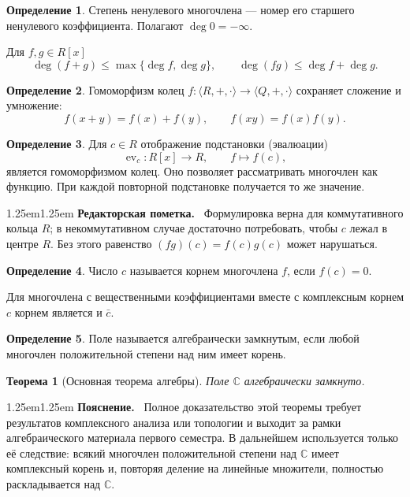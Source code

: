 \documentclass[12pt,a4paper,oneside,openany]{book}
\theoremstyle{definition}
\newtheorem{definition}{Определение}[chapter]
\theoremstyle{plain}
\newtheorem{theorem}{Теорема}[chapter]
\theoremstyle{remark}
\newenvironment{explanation}
  {\begin{adjustwidth}{1.25em}{1.25em}\small
   \noindent\textcolor{logicteal}{\sffamily\bfseries Пояснение.}\ }
  {\par\end{adjustwidth}}
\newenvironment{editorialnote}
  {\begin{adjustwidth}{1.25em}{1.25em}\small
   \noindent\textcolor{editorred}{\sffamily\bfseries Редакторская пометка.}\ }
  {\par\end{adjustwidth}}
\newcommand{\C}{\mathbb{C}}
\begin{document}
\begin{definition}
Степень ненулевого многочлена --- номер его старшего ненулевого
коэффициента. Полагают $\deg0=-\infty$.
\end{definition}

Для $f,g\in R[x]$
\[
  \deg(f+g)\leq\max\{\deg f,\deg g\},
  \qquad
  \deg(fg)\leq\deg f+\deg g.
\]


\begin{definition}
Гомоморфизм колец
$f\colon\langle R,+,\cdot\rangle\to\langle Q,+,\cdot\rangle$ сохраняет
сложение и умножение:
\[
  f(x+y)=f(x)+f(y),
  \qquad f(xy)=f(x)f(y).
\]
\end{definition}

\begin{definition}
Для $c\in R$ отображение подстановки (эвалюации)
\[
  \operatorname{ev}_c\colon R[x]\to R,
  \qquad f\mapsto f(c),
\]
является гомоморфизмом колец. Оно позволяет рассматривать многочлен как
функцию. При каждой повторной подстановке получается то же значение.
\end{definition}

\begin{editorialnote}
Формулировка верна для коммутативного кольца $R$; в некоммутативном
случае достаточно потребовать, чтобы $c$ лежал в центре $R$. Без этого
равенство $(fg)(c)=f(c)g(c)$ может нарушаться.
\end{editorialnote}

\begin{definition}
Число $c$ называется корнем многочлена $f$, если $f(c)=0$.
\end{definition}

Для многочлена с вещественными коэффициентами вместе с комплексным корнем
$c$ корнем является и $\bar c$.

\begin{definition}
Поле называется алгебраически замкнутым, если любой многочлен положительной
степени над ним имеет корень.
\end{definition}

\begin{theorem}[Основная теорема алгебры]
Поле $\C$ алгебраически замкнуто.
\end{theorem}

\begin{explanation}
Полное доказательство этой теоремы требует результатов комплексного
анализа или топологии и выходит за рамки алгебраического материала
первого семестра. В дальнейшем используется только её следствие: всякий
многочлен положительной степени над $\C$ имеет комплексный корень и,
повторяя деление на линейные множители, полностью раскладывается над
$\C$.
\end{explanation}
\end{document}
